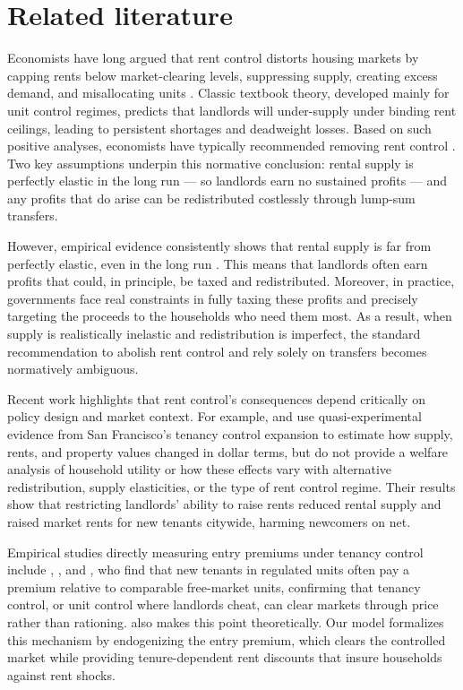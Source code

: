 \documentclass[parskip=full]{article}
\begin{document}
\section{Related literature}\label{sec:related_lit}

Economists have long argued that rent control distorts housing markets by capping rents below market-clearing levels, suppressing supply, creating excess demand, and misallocating units \citep{suen-1989, gl-2003, diamond-2019}. Classic textbook theory, developed mainly for unit control regimes, predicts that landlords will under-supply under binding rent ceilings, leading to persistent shortages and deadweight losses. Based on such positive analyses, economists have typically recommended removing rent control \citep{lindbeck1971, buchanan_1986, friedman_stigler_1946}. Two key assumptions underpin this normative conclusion: rental supply is perfectly elastic in the long run — so landlords earn no sustained profits — and any profits that do arise can be redistributed costlessly through lump-sum transfers.

However, empirical evidence consistently shows that rental supply is far from perfectly elastic, even in the long run \citep{cy-1994, susin-2002, fack-2006, sy-2020, rs-2023}. This means that landlords often earn profits that could, in principle, be taxed and redistributed. Moreover, in practice, governments face real constraints in fully taxing these profits and precisely targeting the proceeds to the households who need them most. As a result, when supply is realistically inelastic and redistribution is imperfect, the standard recommendation to abolish rent control and rely solely on transfers becomes normatively ambiguous.

Recent work highlights that rent control’s consequences depend critically on policy design and market context. For example, \citet{diamond-2019} and \citet{dmq-2019} use quasi-experimental evidence from San Francisco’s tenancy control expansion to estimate how supply, rents, and property values changed in dollar terms, but do not provide a welfare analysis of household utility or how these effects vary with alternative redistribution, supply elasticities, or the type of rent control regime. Their results show that restricting landlords’ ability to raise rents reduced rental supply and raised market rents for new tenants citywide, harming newcomers on net.

Empirical studies directly measuring entry premiums under tenancy control include \citet{nagy-1997}, \citet{early-2000}, and \citet{cjq-2023}, who find that new tenants in regulated units often pay a premium relative to comparable free-market units, confirming that tenancy control, or unit control where landlords cheat, can clear markets through price rather than rationing. \citet{arnott-1995} also makes this point theoretically. Our model formalizes this mechanism by endogenizing the entry premium, which clears the controlled market while providing tenure-dependent rent discounts that insure households against rent shocks.
\end{document}
